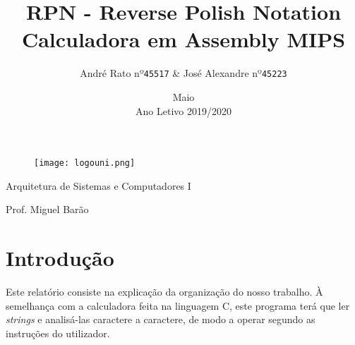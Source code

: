 \documentclass[12pt, a4paper]{article}
\begin{document}
    \clearpage
    \begin{figure}
        \centering
        \texttt{[image: logouni.png]}
    \end{figure}

    \title{RPN - Reverse Polish Notation\\Calculadora em Assembly MIPS}

    \author{André Rato nº\texttt{45517} & José Alexandre nº\texttt{45223}}

    \date{Maio\\Ano Letivo 2019/2020}

    \maketitle
    
    \begin{description}
        \centering
        \item Arquitetura de Sistemas e Computadores I
        \item Prof. Miguel Barão
    \end{description}

    \thispagestyle{empty}
    \newpage
    
    
    \renewcommand{\contentsname}{Índice}
    \tableofcontents
    \newpage
    
    \section{Introdução}
        Este relatório consiste na explicação da organização do nosso trabalho. À semelhança com a calculadora feita na linguagem C, este programa terá que ler \textit{strings} e analisá-las caractere a caractere, de modo a operar segundo as instruções do utilizador.
        
\end{document}
